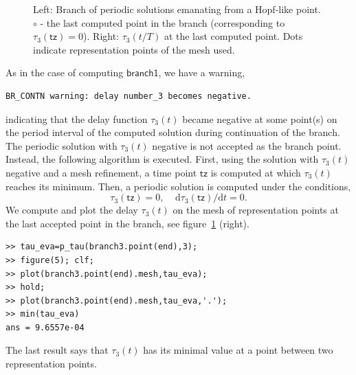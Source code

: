 \documentclass[10pt]{article}
\gdef \parm#1{{\mathsf{#1}}}
\gdef \d{{\mathrm d}}
\begin{document}
{\begin{figure}[h]
\begin{center}
\end{center}
\caption{\small\label{br_ps_sd1}Left: Branch of periodic solutions emanating
from a Hopf-like point. $\circ$ - the last computed point in the branch
(corresponding to $\tau_3(\parm{tz})=0$). Right: $\tau_3(t/T)$ at 
the last computed point. Dots indicate representation points
of the mesh used.}
\end{figure}
As in the case of computing $\parm{branch1}$, we have a warning,
{\small\begin{verbatim}
BR_CONTN warning: delay number_3 becomes negative.
\end{verbatim}}
\noindent
indicating that the delay function $\tau_3(t)$ became negative
at some point(s) on the period interval of the computed solution
during continuation of the branch.
The periodic solution with $\tau_3(t)$ negative is not accepted as the 
branch point.
Instead, the following algorithm is executed. First, using the solution
with $\tau_3(t)$ negative and a mesh refinement, a time point 
$\parm{tz}$ is computed at which $\tau_3(t)$ reaches its minimum.
Then, a periodic solution is computed under the conditions,
\begin{equation}\label{tz_cond}
\tau_3(\parm{tz})=0, \: \: \: \: \: {\d}\tau_3(\parm{tz})/{\d}t=0.
\end{equation}
We compute and plot the delay $\tau_3(t)$ on the mesh of representation points
at the last accepted point in the
branch, see figure~\ref{br_ps_sd1} (right).
{\small\begin{verbatim} 
>> tau_eva=p_tau(branch3.point(end),3);
>> figure(5); clf;
>> plot(branch3.point(end).mesh,tau_eva);
>> hold;
>> plot(branch3.point(end).mesh,tau_eva,'.');
>> min(tau_eva) 
ans = 9.6557e-04
\end{verbatim}}
\noindent
The last result says that $\tau_3(t)$  has its minimal value 
at a point between two representation points.

}
\end{document}

